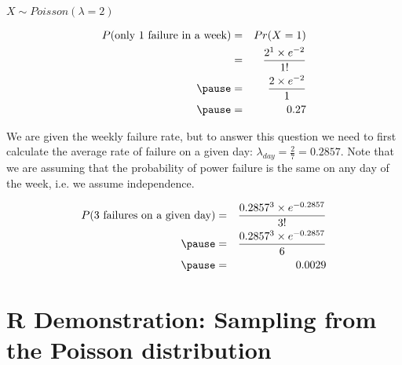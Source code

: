 \documentclass[slidestop,compress,mathserif]{beamer}
\begin{document}
\begin{frame}


\pause

$X \sim Poisson(\lambda = 2)$

\pause

\begin{eqnarray*}
P(\text{only 1 failure in a week}) &=& Pr(X=1)\\
&=& \frac{2^1 \times e^{-2}}{1!} \\
\pause
&=& \frac{2 \times e^{-2}}{1} \\
\pause
&=& 0.27
\end{eqnarray*}

\end{frame}


\begin{frame}


\pause

We are given the weekly failure rate, but to answer this question we need to first calculate the average rate of failure on a given day: $\lambda_{day} = \frac{2}{7} = 0.2857$. Note that we are assuming that the probability of power failure is the same on any day of the week, i.e. we assume independence.

\pause

\begin{eqnarray*}
P(\text{3 failures on a given day}) &=& \frac{0.2857^3 \times e^{-0.2857}}{3!} \\
\pause
&=& \frac{0.2857^3 \times e^{-0.2857}}{6} \\
\pause
&=& 0.0029
\end{eqnarray*}

\end{frame}


\section{R Demonstration: Sampling from the Poisson distribution}
\end{document}
